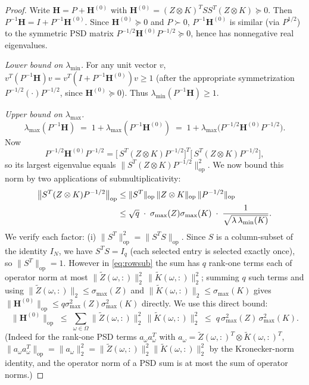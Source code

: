\documentclass[12pt]{article}
\theoremstyle{definition}
\newcommand{\op}{\mathrm{op}}
\newcommand{\Kt}{\widetilde{K}}
\newcommand{\Zt}{\widetilde{Z}}
\begin{document}
\begin{proof}
Write $\mathbf{H}=P+\mathbf{H}^{(0)}$ with $\mathbf{H}^{(0)}=(Z\otimes K)^TSS^T(Z\otimes K)\succeq 0$.
Then $P^{-1}\mathbf{H}=I+P^{-1}\mathbf{H}^{(0)}$. Since $\mathbf{H}^{(0)}\succeq 0$ and $P\succ 0$,
$P^{-1}\mathbf{H}^{(0)}$ is similar (via $P^{1/2}$) to the symmetric PSD matrix
$P^{-1/2}\mathbf{H}^{(0)} P^{-1/2}\succeq 0$, hence has nonnegative real eigenvalues.

\emph{Lower bound on $\lambda_{\min}$.}
For any unit vector $v$, $v^T(P^{-1}\mathbf{H})v=v^T(I+P^{-1}\mathbf{H}^{(0)})v\geq 1$ (after
the appropriate symmetrization $P^{-1/2}(\cdot)P^{-1/2}$, since $\mathbf{H}^{(0)}\succeq 0$).
Thus $\lambda_{\min}(P^{-1}\mathbf{H})\geq 1$.

\emph{Upper bound on $\lambda_{\max}$.}
\[
\lambda_{\max}(P^{-1}\mathbf{H}) \;=\; 1 + \lambda_{\max}(P^{-1}\mathbf{H}^{(0)})
\;=\; 1 + \lambda_{\max}\!\bigl(P^{-1/2}\mathbf{H}^{(0)} P^{-1/2}\bigr).
\]
Now
\[
P^{-1/2}\mathbf{H}^{(0)} P^{-1/2}
= \bigl[\,S^T(Z\otimes K) P^{-1/2}\bigr]^T\bigl[\,S^T(Z\otimes K) P^{-1/2}\bigr],
\]
so its largest eigenvalue equals $\|S^T(Z\otimes K)P^{-1/2}\|_\op^2$. We now bound this norm by
two applications of submultiplicativity:
\begin{align}
\bigl\|S^T(Z\otimes K)P^{-1/2}\bigr\|_\op
&\leq \|S^T\|_\op\,\|Z\otimes K\|_\op\,\|P^{-1/2}\|_\op \notag\\
&\leq \sqrt{q}\;\cdot\;\sigma_{\max}(Z)\sigma_{\max}(K)\;\cdot\;\frac{1}{\sqrt{\lambda\,\lambda_{\min}(K)}}.
  \label{eq:norm-three-factor}
\end{align}
We verify each factor:
(i) $\|S^T\|_\op^2=\|S^TS\|_\op$. Since $S$ is a column-subset of the identity $I_N$, we have
$S^TS=I_q$ (each selected entry is selected exactly once), so $\|S^T\|_\op=1$. However in
\eqref{eq:rowsub} the sum has $q$ rank-one terms each of operator norm at most
$\|\Zt(\omega,:)\|_2^2\,\|\Kt(\omega,:)\|_2^2$; summing $q$ such terms and using
$\|\Zt(\omega,:)\|_2\leq\sigma_{\max}(Z)$ and $\|\Kt(\omega,:)\|_2\leq\sigma_{\max}(K)$ gives
$\|\mathbf{H}^{(0)}\|_\op\leq q\sigma_{\max}^2(Z)\sigma_{\max}^2(K)$ directly. We use this
direct bound:
\begin{equation}\label{eq:H0-norm}
\|\mathbf{H}^{(0)}\|_\op
\;\leq\; \sum_{\omega\in\Omega} \|\Zt(\omega,:)\|_2^2\,\|\Kt(\omega,:)\|_2^2
\;\leq\; q\,\sigma_{\max}^2(Z)\,\sigma_{\max}^2(K).
\end{equation}
(Indeed for the rank-one PSD terms $a_\omega a_\omega^T$ with $a_\omega=\Zt(\omega,:)^T\otimes\Kt(\omega,:)^T$,
$\|a_\omega a_\omega^T\|_\op=\|a_\omega\|_2^2=\|\Zt(\omega,:)\|_2^2\|\Kt(\omega,:)\|_2^2$ by the
Kronecker-norm identity, and the operator norm of a PSD sum is at most the sum of operator norms.)


\end{proof}
\end{document}
